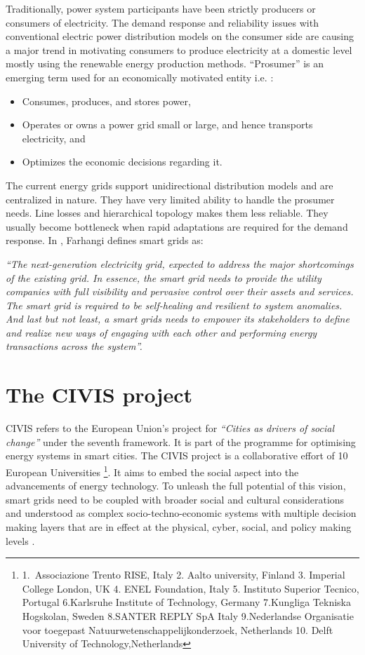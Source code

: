 Traditionally, power system participants have been strictly producers or consumers of electricity. The demand response and reliability issues with conventional electric power distribution models on the consumer side are causing a major trend in motivating consumers to produce electricity at a domestic level mostly using the renewable energy production methods. ``Prosumer'' is an emerging term used for an economically motivated entity i.e. \cite{grijalva2011prosumer}:
\begin{itemize}
\item Consumes, produces, and stores power,
\item Operates or owns a power grid small or large, and hence transports electricity, and
\item Optimizes the economic decisions regarding it.
\end{itemize}

The current energy grids support unidirectional distribution models and are centralized in nature.  They have very limited ability to handle the prosumer needs. Line losses and hierarchical topology makes them less reliable. They usually become bottleneck when rapid adaptations are required for the  demand response. In \cite{farhangi2010path}, Farhangi defines smart grids as:

 \emph{``The next-generation electricity grid, expected to address the major shortcomings of the existing grid. In essence, the smart grid needs to provide the utility companies with full visibility and pervasive control over their assets and services. The smart grid is required to be self-healing and resilient to system anomalies. And last but not least, a smart grids needs to empower its stakeholders to define and realize new ways of engaging with each other and performing energy transactions across the system''.}

\section{The CIVIS project} \label{civisproject}

CIVIS refers to the European Union's project for \emph{``Cities as drivers of social change''} under the seventh framework. It is part of the programme for optimising energy systems in smart cities. The CIVIS project is a collaborative effort of 10 European Universities \footnote{1.\ Associazione Trento RISE, Italy 2. Aalto university, Finland 3. Imperial College London, UK 4. ENEL Foundation, Italy 5. Instituto Superior Tecnico, Portugal 6.Karlsruhe Institute of Technology, Germany 7.Kungliga Tekniska Hogskolan, Sweden 8.SANTER REPLY SpA Italy 9.Nederlandse Organisatie voor toegepast Natuurwetenschappelijkonderzoek, Netherlands 10. Delft University of Technology,Netherlands}. It aims to embed the social aspect into the advancements of energy technology. To unleash the full potential of this vision, smart grids need to be coupled with broader social and cultural considerations and understood as complex socio-techno-economic systems with multiple decision making layers that are in effect at the physical, cyber, social, and policy making levels \cite{civisproposal}.

